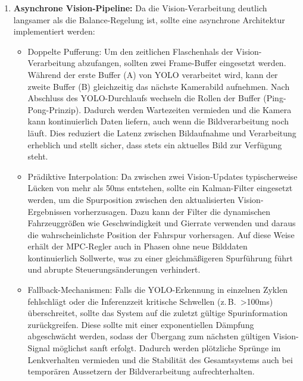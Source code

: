 \begin{enumerate}
\item \textbf{Asynchrone Vision-Pipeline:} Da die Vision-Verarbeitung deutlich langsamer als die 
Balance-Regelung ist, sollte eine asynchrone Architektur implementiert werden:
\begin{itemize}
  \item Doppelte Pufferung: Um den zeitlichen Flaschenhals der Vision-Verarbeitung abzufangen, 
  sollten zwei Frame-Buffer eingesetzt werden. Während der erste Buffer (A) von YOLO verarbeitet wird, 
  kann der zweite Buffer (B) gleichzeitig das nächste Kamerabild aufnehmen. Nach Abschluss des 
  YOLO-Durchlaufs wechseln die Rollen der Buffer (Ping-Pong-Prinzip). Dadurch werden Wartezeiten 
  vermieden und die Kamera kann kontinuierlich Daten liefern, auch wenn die Bildverarbeitung noch läuft. 
  Dies reduziert die Latenz zwischen Bildaufnahme und Verarbeitung erheblich und stellt sicher, dass 
  stets ein aktuelles Bild zur Verfügung steht.
  
  \item Prädiktive Interpolation: Da zwischen zwei Vision-Updates typischerweise Lücken von mehr 
  als 50ms entstehen, sollte ein Kalman-Filter eingesetzt werden, um die Spurposition zwischen den 
  aktualisierten Vision-Ergebnissen vorherzusagen. Dazu kann der Filter die dynamischen 
  Fahrzeuggrößen wie Geschwindigkeit und Gierrate verwenden und daraus die wahrscheinlichste 
  Position der Fahrspur vorhersagen. Auf diese Weise erhält der MPC-Regler auch in Phasen ohne neue Bilddaten 
  kontinuierlich Sollwerte, was zu einer gleichmäßigeren Spurführung führt und abrupte 
  Steuerungsänderungen verhindert.
  
  \item Fallback-Mechanismen: Falls die YOLO-Erkennung in einzelnen Zyklen fehlschlägt oder die 
  Inferenzzeit kritische Schwellen (z.\,B.\ >100ms) überschreitet, sollte das System auf die zuletzt 
  gültige Spurinformation zurückgreifen. Diese sollte mit einer exponentiellen Dämpfung abgeschwächt werden, 
  sodass der Übergang zum nächsten gültigen Vision-Signal möglichst sanft erfolgt. Dadurch werden 
  plötzliche Sprünge im Lenkverhalten vermieden und die Stabilität des Gesamtsystems auch bei 
  temporären Aussetzern der Bildverarbeitung aufrechterhalten.
\end{itemize}
\end{enumerate}

